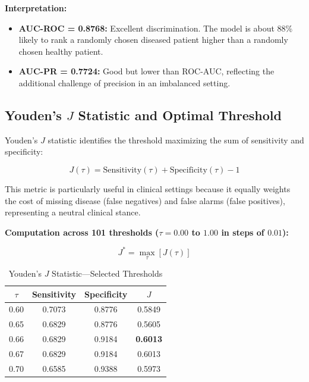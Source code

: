 \documentclass[11pt]{article}
\begin{document}
\textbf{Interpretation:}
\begin{itemize}
    \item \textbf{AUC-ROC = 0.8768:} Excellent discrimination. The model is about 88\% likely to rank a randomly chosen diseased patient higher than a randomly chosen healthy patient.
    \item \textbf{AUC-PR = 0.7724:} Good but lower than ROC-AUC, reflecting the additional challenge of precision in an imbalanced setting.
\end{itemize}

\subsection{Youden's $J$ Statistic and Optimal Threshold}

Youden's $J$ statistic identifies the threshold maximizing the sum of sensitivity and specificity:

\begin{equation}
    J(\tau) = \text{Sensitivity}(\tau) + \text{Specificity}(\tau) - 1
\end{equation}

This metric is particularly useful in clinical settings because it equally weights the cost of missing disease (false negatives) and false alarms (false positives), representing a neutral clinical stance.

\textbf{Computation across 101 thresholds ($\tau = 0.00$ to $1.00$ in steps of $0.01$):}

\begin{equation}
    J^* = \max_{\tau} [J(\tau)]
\end{equation}

\begin{table}[H]
    \centering
    \caption{Youden's $J$ Statistic—Selected Thresholds}
    \begin{tabular}{cccc}
        \toprule
        $\tau$ & Sensitivity & Specificity & $J$ \\
        \midrule
        0.60 & 0.7073 & 0.8776 & 0.5849 \\
        0.65 & 0.6829 & 0.8776 & 0.5605 \\
        0.66 & 0.6829 & 0.9184 & \textbf{0.6013} \\
        0.67 & 0.6829 & 0.9184 & 0.6013 \\
        0.70 & 0.6585 & 0.9388 & 0.5973 \\
        \bottomrule
    \end{tabular}
    \label{tab:youden_j}
\end{table}
\end{document}
